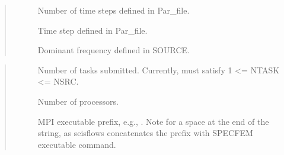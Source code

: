 \documentclass[letterpaper,10pt,english]{sphinxmanual}
\begin{document}
\begin{quote}\begin{description}
\item[{}] \leavevmode
Number of time steps defined in Par\_file.

\item[{}] \leavevmode
Time step defined in Par\_file.

\item[{}] \leavevmode
Dominant frequency defined in SOURCE.

\end{description}\end{quote}

\begin{quote}\begin{description}
\item[{}] \leavevmode
Number of tasks submitted. Currently,  must satisfy 1 \textless{}= NTASK \textless{}= NSRC.

\item[{}] \leavevmode
Number of processors.

\item[{}] \leavevmode
MPI executable prefix, e.g., . Note for a space at the end of the string, as seisflows concatenates the prefix with SPECFEM executable command.

\end{description}\end{quote}
\end{document}
